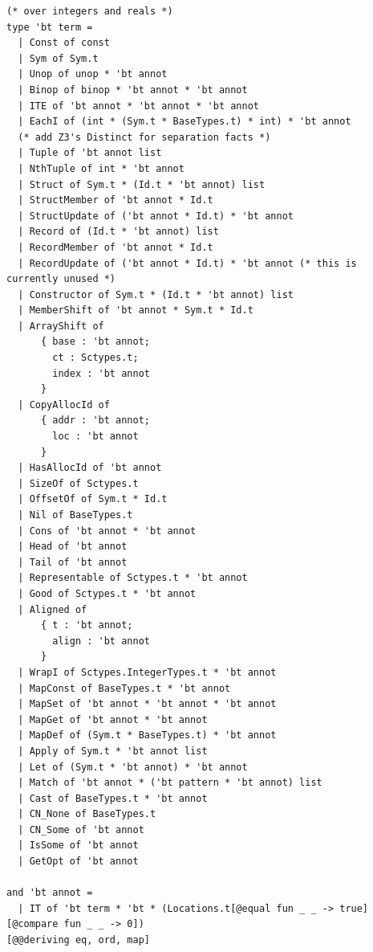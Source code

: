\documentclass[withindex,glossary]{cam-thesis}
\begin{document}
\begin{verbatim}
(* over integers and reals *)
type 'bt term =
  | Const of const
  | Sym of Sym.t
  | Unop of unop * 'bt annot
  | Binop of binop * 'bt annot * 'bt annot
  | ITE of 'bt annot * 'bt annot * 'bt annot
  | EachI of (int * (Sym.t * BaseTypes.t) * int) * 'bt annot
  (* add Z3's Distinct for separation facts *)
  | Tuple of 'bt annot list
  | NthTuple of int * 'bt annot
  | Struct of Sym.t * (Id.t * 'bt annot) list
  | StructMember of 'bt annot * Id.t
  | StructUpdate of ('bt annot * Id.t) * 'bt annot
  | Record of (Id.t * 'bt annot) list
  | RecordMember of 'bt annot * Id.t
  | RecordUpdate of ('bt annot * Id.t) * 'bt annot (* this is currently unused *)
  | Constructor of Sym.t * (Id.t * 'bt annot) list
  | MemberShift of 'bt annot * Sym.t * Id.t
  | ArrayShift of
      { base : 'bt annot;
        ct : Sctypes.t;
        index : 'bt annot
      }
  | CopyAllocId of
      { addr : 'bt annot;
        loc : 'bt annot
      }
  | HasAllocId of 'bt annot
  | SizeOf of Sctypes.t
  | OffsetOf of Sym.t * Id.t
  | Nil of BaseTypes.t
  | Cons of 'bt annot * 'bt annot
  | Head of 'bt annot
  | Tail of 'bt annot
  | Representable of Sctypes.t * 'bt annot
  | Good of Sctypes.t * 'bt annot
  | Aligned of
      { t : 'bt annot;
        align : 'bt annot
      }
  | WrapI of Sctypes.IntegerTypes.t * 'bt annot
  | MapConst of BaseTypes.t * 'bt annot
  | MapSet of 'bt annot * 'bt annot * 'bt annot
  | MapGet of 'bt annot * 'bt annot
  | MapDef of (Sym.t * BaseTypes.t) * 'bt annot
  | Apply of Sym.t * 'bt annot list
  | Let of (Sym.t * 'bt annot) * 'bt annot
  | Match of 'bt annot * ('bt pattern * 'bt annot) list
  | Cast of BaseTypes.t * 'bt annot
  | CN_None of BaseTypes.t
  | CN_Some of 'bt annot
  | IsSome of 'bt annot
  | GetOpt of 'bt annot

and 'bt annot =
  | IT of 'bt term * 'bt * (Locations.t[@equal fun _ _ -> true] [@compare fun _ _ -> 0])
[@@deriving eq, ord, map]
\end{verbatim}



\printthesisindex
\end{document}
